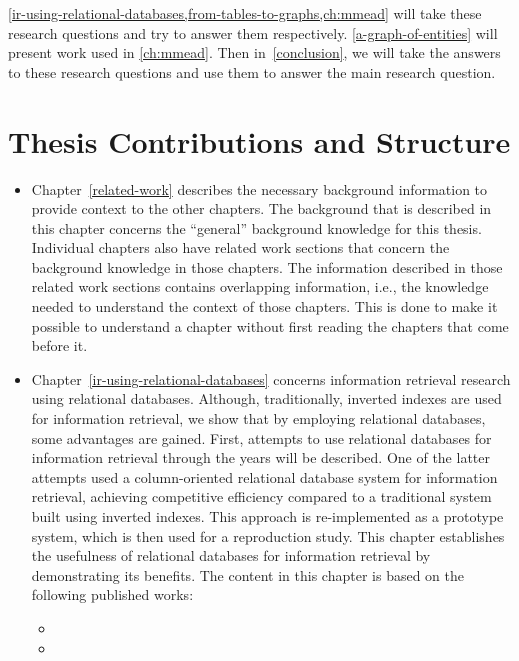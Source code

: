 \cref{ir-using-relational-databases,from-tables-to-graphs,ch:mmead} will take these research questions and try to answer them respectively. \cref{a-graph-of-entities} will present work used in \cref{ch:mmead}. Then in~\cref{conclusion}, we will take the answers to these research questions and use them to answer the main research question. 

\section{Thesis Contributions and Structure}

\begin{itemize}
	\item Chapter~\ref{related-work} describes the necessary background information to provide context to the other chapters. The background that is described in this chapter concerns the ``general'' background knowledge for this thesis. Individual chapters also have related work sections that concern the background knowledge in those chapters. The information described in those related work sections contains overlapping information, i.e., the knowledge needed to understand the context of those chapters. This is done to make it possible to understand a chapter without first reading the chapters that come before it. 
	
	\item Chapter~\ref{ir-using-relational-databases} concerns information retrieval research using relational databases. 
	Although, traditionally, inverted indexes are used for information retrieval, we show that by employing relational databases, some advantages are gained. 
	First, attempts to use relational databases for information retrieval through the years will be described. One of the latter attempts used a column-oriented relational database system for information retrieval, achieving competitive efficiency compared to a traditional system built using inverted indexes. This approach is re-implemented as a prototype system, which is then used for a reproduction study. This chapter establishes the usefulness of relational databases for information retrieval by demonstrating its benefits. The content in this chapter is based on the following published works: 
	
	{
		\scriptsize
		\begin{itemize}
			\item {}
			\item {}
		\end{itemize}
	}
	

\end{itemize}
